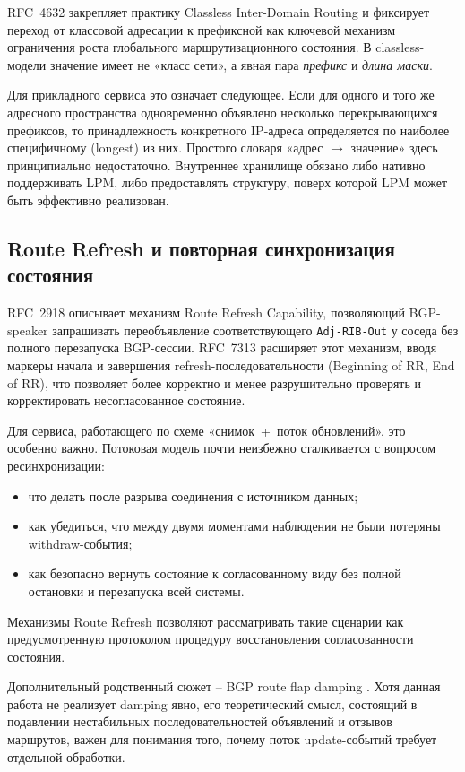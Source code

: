 RFC~4632 \cite{rfc4632} закрепляет практику Classless Inter-Domain
Routing и фиксирует переход от классовой адресации к префиксной как
ключевой механизм ограничения роста глобального маршрутизационного
состояния. В classless-модели значение имеет не «класс сети», а явная
пара \textit{префикс} и \textit{длина маски}.

Для прикладного сервиса это означает следующее. Если для одного и того
же адресного пространства одновременно объявлено несколько
перекрывающихся префиксов, то принадлежность конкретного IP-адреса
определяется по наиболее специфичному (longest) из них. Простого
словаря «адрес $\rightarrow$ значение» здесь принципиально
недостаточно. Внутреннее хранилище обязано либо нативно поддерживать
LPM, либо предоставлять структуру, поверх которой LPM может быть
эффективно реализован.

\subsection{Route Refresh и повторная синхронизация состояния}

RFC~2918 \cite{rfc2918} описывает механизм Route Refresh Capability,
позволяющий BGP-speaker запрашивать переобъявление соответствующего
\texttt{Adj-RIB-Out} у соседа без полного перезапуска BGP-сессии.
RFC~7313 \cite{rfc7313} расширяет этот механизм, вводя маркеры начала
и завершения refresh-последовательности (Beginning of RR, End of RR),
что позволяет более корректно и менее разрушительно проверять и
корректировать несогласованное состояние.

Для сервиса, работающего по схеме «снимок~+~поток обновлений», это
особенно важно. Потоковая модель почти неизбежно сталкивается с
вопросом ресинхронизации:

\begin{itemize}
\item что делать после разрыва соединения с источником данных;
\item как убедиться, что между двумя моментами наблюдения не были
потеряны withdraw-события;
\item как безопасно вернуть состояние к согласованному виду без полной
остановки и перезапуска всей системы.
\end{itemize}

Механизмы Route Refresh позволяют рассматривать такие сценарии как
предусмотренную протоколом процедуру восстановления согласованности
состояния.

Дополнительный родственный сюжет -- BGP route flap damping
\cite{rfc2439}. Хотя данная работа не реализует damping явно, его
теоретический смысл, состоящий в подавлении нестабильных
последовательностей объявлений и отзывов маршрутов, важен для понимания
того, почему поток update-событий требует отдельной обработки.

